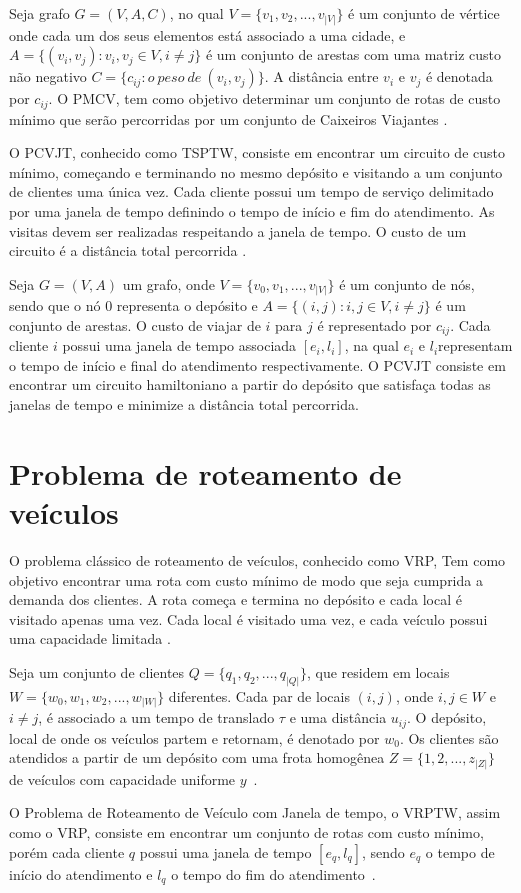 Seja grafo $G = (V,A,C)$, no qual $V = \{v_1, v_2, ..., v_{|V|}\}$ é um conjunto de vértice onde cada um dos seus elementos está associado a uma cidade, e $A = \{(v_i,v_j): v_i,v_j \in V, i \neq j \}$ é um conjunto de arestas com uma matriz custo não negativo $C = \{c_{ij}: o \ peso \ de \ (v_i,v_j)\}$. A distância entre $v_i$ e $v_j$ é denotada por $c_{ij}$. O \ac{PMCV}, tem como objetivo determinar um conjunto de rotas de custo mínimo que serão percorridas por um conjunto de Caixeiros Viajantes \cite{meng:2012}. 

O \ac{PCVJT}, conhecido como \ac{TSPTW}, consiste em encontrar um circuito de custo mínimo, começando e terminando no mesmo depósito e visitando a um conjunto de clientes uma única vez. Cada cliente possui um tempo de serviço delimitado por uma janela de tempo definindo o tempo de início e fim do atendimento. As visitas devem ser realizadas respeitando a janela de tempo. O custo de um circuito é a distância total percorrida \cite{urrutia:2010}.

Seja $G=(V,A)$ um grafo, onde $V = \{v_0, v_1, ..., v_{|V|} \}$ é um conjunto de nós, sendo que o nó $0$ representa o depósito e $A = \{ (i,j): i,j \in V, i \neq j \}$ é um conjunto de arestas. O custo de viajar de $i$ para $j$ é representado por $c_{ij}$. Cada cliente $i$ possui uma janela de tempo associada $[e_i, l_i]$, na qual $e_i$ e $l_i$representam o tempo de início e final do atendimento respectivamente. O \ac{PCVJT} consiste em encontrar um circuito hamiltoniano a partir do depósito que satisfaça todas as janelas de tempo e minimize a distância total percorrida\cite{urrutia:2010}.

\section{Problema de roteamento de veículos}

O problema clássico de roteamento de veículos, conhecido como \ac{VRP}, Tem como objetivo encontrar uma rota com custo mínimo de modo que seja cumprida a demanda dos clientes. A rota começa e termina no depósito e cada local é visitado apenas uma vez. Cada local é visitado uma vez, e cada veículo possui uma capacidade limitada \cite{gold:2008}.

Seja um conjunto de clientes $Q = \{q_1, q_2, ..., q_{|Q|}\}$, que residem em locais $W = \{w_0, w_1, w_2, ..., w_{|W|}\}$ diferentes. Cada par de locais $(i,j)$, onde  $i,j \in W$ e $i \neq j$, é associado a um tempo de translado $\tau$ e uma distância $u_{ij}$. O depósito, local de onde os veículos partem e retornam, é denotado por $w_0$.
Os clientes são atendidos a partir de um depósito com uma frota  homogênea $Z = \{1, 2, ..., z_{|Z|}\}$ de veículos com capacidade uniforme $y$~\cite{gold:2008}.

O Problema de Roteamento de Veículo com Janela de tempo, o \ac{VRPTW}, assim como o \ac{VRP}, consiste em encontrar um conjunto de rotas com custo mínimo, porém cada cliente $q$ possui uma janela de tempo $[e_{q}, l_{q}]$, sendo $e_{q}$ o tempo de início do atendimento e $l_{q}$ o tempo do fim do atendimento~\cite{gold:2008}.